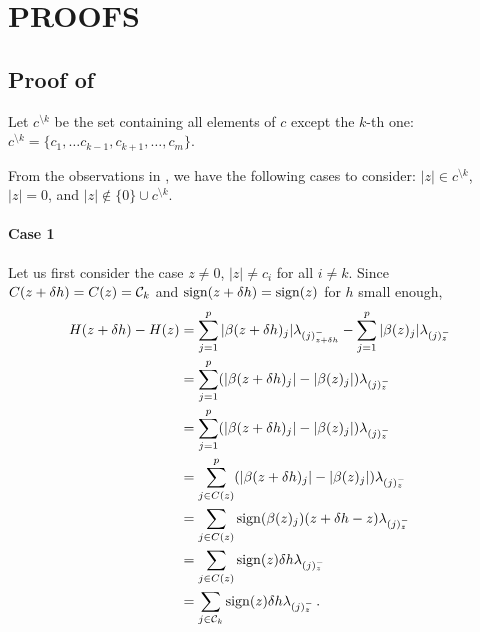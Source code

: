 \section{PROOFS}\label{sec:proofs}

\subsection{Proof of }
\label{app:proof_directional_derivative}

Let \(c^{\setminus k}\) be the set containing all elements of $c$ except the $k$-th one: $c^{\setminus k} =  \{c_1, \ldots c_{k-1}, c_{k+1}, \ldots, c_m \}$.

From the observations in ,
we have the following cases to consider: \(|z| \in c^{\setminus k}\),
\(|z| = 0\), and \(|z| \notin \{0\} \cup c^{\setminus k}\).


\paragraph{Case 1}
Let us first consider the case $z \neq 0$, $|z| \neq c_i$ for all $i \neq k$.
Since \(C(z + \delta h) = C(z) = \mathcal{C}_k\) and $\operatorname{sign}(z + \delta h) = \operatorname{sign}(z)$ for $h$ small enough,
\begin{align}
  H(z + \delta h) - H(z)
   & = \sum_{j =1}^p |\beta(z + \delta h)_j| \lambda_{(j)^-_{z + \delta h}}
  - \sum_{j=1}^p |\beta(z)_j| \lambda_{(j)^-_z} \nonumber                                       \\
   & = \sum_{j =1}^p (|\beta(z + \delta h)_j| - |\beta(z)_j|) \lambda_{(j)^-_z} \nonumber       \\
   & = \sum_{j =1}^p (|\beta(z + \delta h)_j| - |\beta(z)_j|) \lambda_{(j)^-_z} \nonumber       \\
   & = \sum_{j \in C(z)}^p (|\beta(z + \delta h)_j| - |\beta(z)_j|) \lambda_{(j)^-_z} \nonumber \\
   & = \sum_{j \in C(z)} \operatorname{sign}(\beta(z)_j) (z + \delta h - z) \lambda_{(j)^-_z} \nonumber       \\
   & = \sum_{j \in C(z)} \operatorname{sign}(z) \delta h  \lambda_{(j)^-_z} \nonumber                         \\
   & = \sum_{j \in \mathcal{C}_k} \operatorname{sign}(z) \delta h  \lambda_{(j)^-_z} \, .
\end{align}

